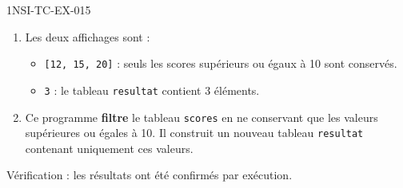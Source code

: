 \begin{corrige}{1NSI-TC-EX-015}
\begin{enumerate}
  \item Les deux affichages sont :
  \begin{itemize}
    \item \lstinline{[12, 15, 20]} : seuls les scores supérieurs ou égaux à 10 sont conservés.
    \item \lstinline{3} : le tableau \lstinline{resultat} contient 3 éléments.
  \end{itemize}

  \item Ce programme \textbf{filtre} le tableau \lstinline{scores} en ne conservant que les valeurs supérieures ou égales à 10. Il construit un nouveau tableau \lstinline{resultat} contenant uniquement ces valeurs.
\end{enumerate}

Vérification : les résultats ont été confirmés par exécution.
\end{corrige}
